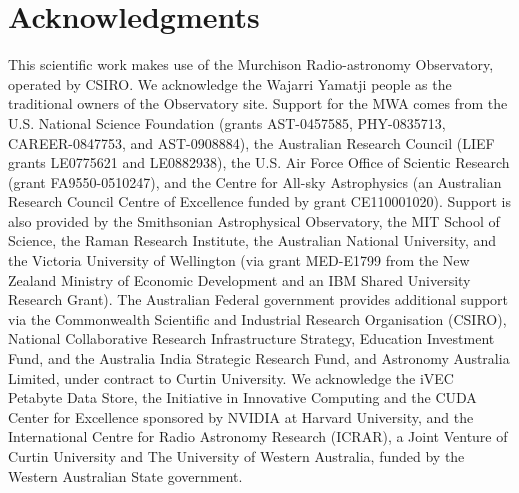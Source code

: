 \documentclass[useAMS,usenatbib]{mn2e}
\begin{document}
\section*{Acknowledgments}
This scientific work makes use of the Murchison Radio-astronomy Observatory, operated by CSIRO. We acknowledge the Wajarri Yamatji people as the traditional owners of the Observatory site. Support for the MWA comes from the U.S. National Science Foundation (grants AST-0457585, PHY-0835713, CAREER-0847753, and AST-0908884), the Australian Research Council (LIEF grants LE0775621 and LE0882938), the U.S. Air Force Office of Scientic Research (grant FA9550-0510247), and the Centre for All-sky Astrophysics (an Australian Research Council Centre of Excellence funded by grant CE110001020). Support is also provided by the Smithsonian Astrophysical Observatory, the MIT School of Science, the Raman Research Institute, the Australian National University, and the Victoria University of Wellington (via grant MED-E1799 from the New Zealand Ministry of Economic Development and an IBM Shared University Research Grant). The Australian Federal government provides additional support via the Commonwealth Scientific and Industrial Research Organisation (CSIRO), National Collaborative Research Infrastructure Strategy, Education Investment Fund, and the Australia India Strategic Research Fund, and Astronomy Australia Limited, under contract to Curtin University. We acknowledge the iVEC Petabyte Data Store, the Initiative in Innovative Computing and the CUDA Center for Excellence sponsored by NVIDIA at Harvard University, and the International Centre for Radio Astronomy Research (ICRAR), a Joint Venture of Curtin University and The University of Western Australia, funded by the Western Australian State government. 
\appendix
\end{document}
